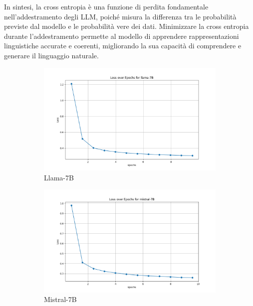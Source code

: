 In sintesi, la cross entropia è una funzione di perdita fondamentale nell'addestramento degli LLM, poiché misura la differenza tra le probabilità previste dal modello e le probabilità vere dei dati. Minimizzare la cross entropia durante l'addestramento permette al modello di apprendere rappresentazioni linguistiche accurate e coerenti, migliorando la sua capacità di comprendere e generare il linguaggio naturale.
\begin{figure}[ht]
	\centering
	\begin{subfigure}{0.33\textwidth}
		\includegraphics[width=1.0\textwidth]{Immagini/train_loss/llama-7B-loss_plot.png}
		\caption{Llama-7B}
	\end{subfigure}%
	\begin{subfigure}{0.33\textwidth}
		\includegraphics[width=1.0\textwidth]{Immagini/train_loss/mistral-7B-loss_plot.png}
		\caption{Mistral-7B}
	\end{subfigure}%
 	\begin{subfigure}{0.33\textwidth}

\end{subfigure}
\end{figure}
